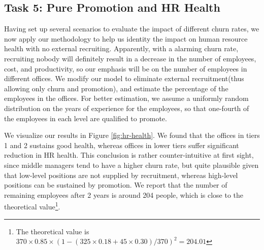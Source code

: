 \documentclass[tcn = 37075, sheet = false, abstract = false]{mcmthesis}
\begin{document}
	\subsection{Task 5: Pure Promotion and HR Health}
	Having set up several scenarios to evaluate the impact of different churn rates, we now apply our methodology to help us identity the impact on human resource health with no external recruiting. Apparently, with a alarming churn rate, recruiting nobody will definitely result in a decrease in the number of employees, cost, and productivity, so our emphasis will be on the number of employees in different offices. We modify our model to eliminate external recruitment(thus allowing only churn and promotion), and estimate the percentage of the employees in the offices. For better estimation, we assume a uniformly random distribution on the years of experience for the employees, so that one-fourth of the employees in each level are qualified to promote.
	
	We visualize our results in Figure \ref{fig:hr-health}. We found that the offices in tiers 1 and 2 sustains good health, whereas offices in lower tiers suffer significant reduction in HR health. This conclusion is rather counter-intuitive at first sight, since middle managers tend to have a higher churn rate, but quite plausible given that low-level positions are not supplied by recruitment, whereas high-level positions can be sustained by promotion.
	We report that the number of remaining employees after 2 years is around 204 people, which is close to the theoretical value\footnote{The theoretical value is $370 \times 0.85 \times (1 - (325 \times 0.18 + 45 \times 0.30) / 370 )^2 = 204.01$}.
	
\end{document}
